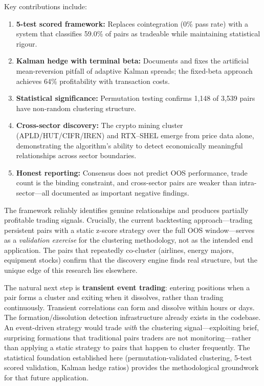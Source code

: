 \documentclass[11pt, a4paper]{article}
\begin{document}
Key contributions include:

\begin{enumerate}
    \item \textbf{5-test scored framework:} Replaces cointegration (0\% pass rate) with a system that classifies 59.0\% of pairs as tradeable while maintaining statistical rigour.
    \item \textbf{Kalman hedge with terminal beta:} Documents and fixes the artificial mean-reversion pitfall of adaptive Kalman spreads; the fixed-beta approach achieves 64\% profitability with transaction costs.
    \item \textbf{Statistical significance:} Permutation testing confirms 1,148 of 3,539 pairs have non-random clustering structure.
    \item \textbf{Cross-sector discovery:} The crypto mining cluster (APLD/HUT/CIFR/IREN) and RTX--SHEL emerge from price data alone, demonstrating the algorithm's ability to detect economically meaningful relationships across sector boundaries.
    \item \textbf{Honest reporting:} Consensus does not predict OOS performance, trade count is the binding constraint, and cross-sector pairs are weaker than intra-sector---all documented as important negative findings.
\end{enumerate}

The framework reliably identifies genuine relationships and produces partially profitable trading signals. Crucially, the current backtesting approach---trading persistent pairs with a static z-score strategy over the full OOS window---serves as a \textit{validation exercise} for the clustering methodology, not as the intended end application. The pairs that repeatedly co-cluster (airlines, energy majors, equipment stocks) confirm that the discovery engine finds real structure, but the unique edge of this research lies elsewhere.

The natural next step is \textbf{transient event trading}: entering positions when a pair forms a cluster and exiting when it dissolves, rather than trading continuously. Transient correlations can form and dissolve within hours or days. The formation/dissolution detection infrastructure already exists in the codebase. An event-driven strategy would trade \textit{with} the clustering signal---exploiting brief, surprising formations that traditional pairs traders are not monitoring---rather than applying a static strategy to pairs that happen to cluster frequently. The statistical foundation established here (permutation-validated clustering, 5-test scored validation, Kalman hedge ratios) provides the methodological groundwork for that future application.
\end{document}
